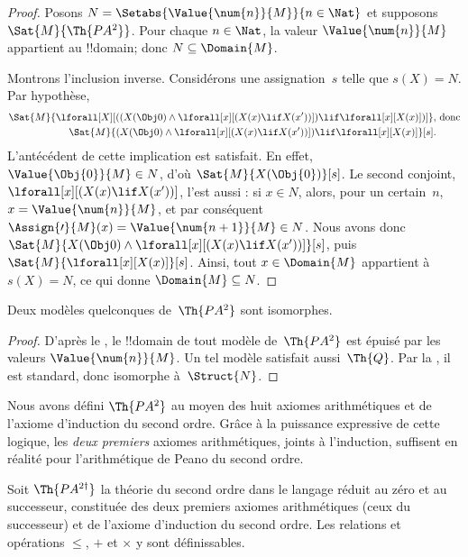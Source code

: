 \documentclass[../../../include/open-logic-section]{subfiles}
\begin{document}
\begin{proof}
Posons
$N=\Setabs{\Value{\num{n}}{M}}{n\in\Nat}$
et supposons $\Sat{M}{\Th{PA^2}}$. Pour chaque
$n\in\Nat$, la valeur $\Value{\num{n}}{M}$
appartient au !!{domain}; donc
$N\subseteq\Domain{M}$.

Montrons l'inclusion inverse. Considérons une
assignation~$s$ telle que $s(X)=N$. Par hypothèse,
\begin{align*}
\Sat{M}{\lforall[X][((X(\Obj 0) \land \lforall[x][(X(x)
      \lif X(x'))]) \lif \lforall[x][X(x)])]}, & \text{ donc}\\
\Sat{M}{(X(\Obj 0) \land \lforall[x][(X(x) \lif X(x'))]) \lif
  \lforall[x][X(x)]}[s]. &
\end{align*}
L'antécédent de cette implication est satisfait.
En effet, $\Value{\Obj{0}}{M}\in N$, d'où
$\Sat{M}{X(\Obj{0})}[s]$. Le second conjoint,
$\lforall[x][(X(x)\lif X(x'))]$, l'est aussi :
si $x\in N$, alors, pour un certain~$n$,
$x=\Value{\num{n}}{M}$, et par conséquent
$\Assign{\prime}{M}(x)=
\Value{\num{n+1}}{M}\in N$.
Nous avons donc
$\Sat{M}{X(\Obj 0) \land
\lforall[x][(X(x) \lif X(x'))]}[s]$,
puis $\Sat{M}{\lforall[x][X(x)]}[s]$.
Ainsi, tout $x\in\Domain{M}$ appartient à
$s(X)=N$, ce qui donne $\Domain{M}\subseteq N$.
\end{proof}

\begin{cor}
Deux modèles quelconques de~$\Th{PA^2}$ sont
isomorphes.
\end{cor}

\begin{proof}
D'après le , le !!{domain}
de tout modèle de~$\Th{PA^2}$ est épuisé par
les valeurs $\Value{\num{n}}{M}$. Un tel modèle
satisfait aussi~$\Th{Q}$. Par la
, il est
standard, donc isomorphe à~$\Struct{N}$.
\end{proof}

Nous avons défini $\Th{PA^2}$ au moyen des huit
axiomes arithmétiques et de l'axiome d'induction
du second ordre. Grâce à la puissance expressive
de cette logique, les \emph{deux premiers} axiomes
arithmétiques, joints à l'induction, suffisent
en réalité pour l'arithmétique de Peano du second
ordre.

\begin{prop}
Soit $\Th{PA^{2\dagger}}$ la théorie du second ordre
dans le langage réduit au zéro et au successeur, constituée des deux premiers axiomes arithmétiques
(ceux du successeur) et de l'axiome d'induction
du second ordre. Les relations et opérations
$\le$, $+$ et $\times$ y sont définissables.
\end{prop}
\end{document}
